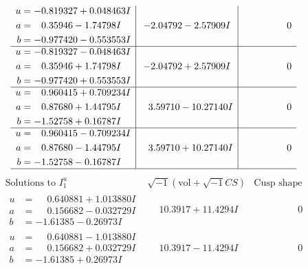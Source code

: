 \documentclass[1p]{elsarticle_modified}
\theoremstyle{definition}
\newcommand{\I}{\sqrt{-1}}
\begin{document}
$$\begin{array}{c|c|c}
\begin{aligned}
u &= -0.819327 + 0.048463 I \\
a &= \phantom{-}0.35946 - 1.74798 I \\
b &= -0.977420 - 0.553553 I\end{aligned}
 & -2.04792 - 2.57909 I & \phantom{-0.000000 } 0 \\ \hline\begin{aligned}
u &= -0.819327 - 0.048463 I \\
a &= \phantom{-}0.35946 + 1.74798 I \\
b &= -0.977420 + 0.553553 I\end{aligned}
 & -2.04792 + 2.57909 I & \phantom{-0.000000 } 0 \\ \hline\begin{aligned}
u &= \phantom{-}0.960415 + 0.709234 I \\
a &= \phantom{-}0.87680 + 1.44795 I \\
b &= -1.52758 + 0.16787 I\end{aligned}
 & \phantom{-}3.59710 - 10.27140 I & \phantom{-0.000000 } 0 \\ \hline\begin{aligned}
u &= \phantom{-}0.960415 - 0.709234 I \\
a &= \phantom{-}0.87680 - 1.44795 I \\
b &= -1.52758 - 0.16787 I\end{aligned}
 & \phantom{-}3.59710 + 10.27140 I & \phantom{-0.000000 } 0\\
 \hline 
 \end{array}$$\newpage$$\begin{array}{c|c|c}  
\text{Solutions to }I^u_{1}& \I (\text{vol} + \sqrt{-1}CS) & \text{Cusp shape}\\
 \hline 
\begin{aligned}
u &= \phantom{-}0.640881 + 1.013880 I \\
a &= \phantom{-}0.156682 - 0.032729 I \\
b &= -1.61385 - 0.26973 I\end{aligned}
 & \phantom{-}10.3917 + 11.4294 I & \phantom{-0.000000 } 0 \\ \hline\begin{aligned}
u &= \phantom{-}0.640881 - 1.013880 I \\
a &= \phantom{-}0.156682 + 0.032729 I \\
b &= -1.61385 + 0.26973 I\end{aligned}
 & \phantom{-}10.3917 - 11.4294 I & \phantom{-0.000000 } 0 \\ \hline\begin{aligned}

\end{aligned}
\end{array}$$
\end{document}
